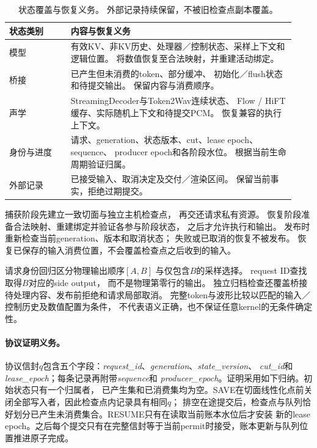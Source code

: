 \begin{table}[tbp]
    \centering
    \small
    \setlength{\tabcolsep}{5pt}
    \caption{
        状态覆盖与恢复义务。
        外部记录持续保留，不被旧检查点副本覆盖。
    }
    \label{tab:app_state_contract}
    \begin{tabular}{
        @{}
        >{\raggedright\arraybackslash}p{0.20\linewidth}
        >{\raggedright\arraybackslash}p{0.73\linewidth}
        @{}
    }
        \toprule
        状态类别 & 内容与恢复义务 \\
        \midrule
        模型
        & 有效KV、非KV历史、处理器／控制状态、采样上下文和逻辑位置。
          将数值恢复至合法映射，并重建活动绑定。 \\
        桥接
        & 已产生但未消费的token、部分缓冲、
          初始化／flush状态和待提交输出。
          保留内容与消费顺序。 \\
        声学
        & StreamingDecoder与Token2Wav连续状态、
          Flow / HiFT缓存、实际随机上下文和待提交PCM。
          恢复兼容的执行上下文。 \\
        身份与进度
        & 请求、generation、状态版本、cut、lease epoch、sequence、
          producer epoch和各阶段水位。
          根据当前生命周期验证归属。 \\
        外部记录
        & 已接受输入、取消决定及交付／渲染区间。
          保留当前事实，拒绝过期提交。 \\
        \bottomrule
    \end{tabular}
\end{table}

捕获阶段先建立一致切面与独立主机检查点，
再交还请求私有资源。
恢复阶段准备合法映射、重建绑定并验证各参与阶段状态，
之后才允许执行和输出。
发布时重新检查当前generation、版本和取消状态；
失败或已取消的恢复不被发布。
恢复已保存的输入消费位置，不会覆盖检查点之后收到的输入。

请求身份回归区分物理输出顺序$[A,B]$
与仅包含$B$的采样选择。
request ID查找取得$B$对应的side output，
而不是物理第零行的输出。
独立归档检查还覆盖桥接待处理内容、发布前拒绝和请求局部取消。
完整token与波形比较以匹配的输入／控制历史及数值配置为条件，
不代表语义正确，也不保证任意kernel的无条件确定性。

\paragraph{协议证明义务。}
协议信封$q$包含五个字段：\textit{request\_id}、\textit{generation}、\textit{state\_version}、
\textit{cut\_id}和\textit{lease\_epoch}；每条记录再附带\textit{sequence}和
\textit{producer\_epoch}。证明采用如下归纳。初始状态只有一个归属者，
已产生集和已消费集均为空。SAVE在切面线性化点前关闭全部写入者，因此检查点内记录具有相同$q$；
排空在途提交后，检查点与队列恰好划分已产生未消费集合。RESUME只有在读取当前账本水位后才安装
新的lease epoch。之后每个提交只有在完整信封等于当前permit时接受，账本更新与队列位置推进原子完成。

